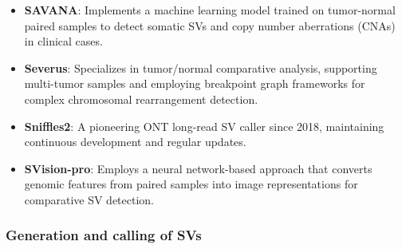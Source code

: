 \begin{itemize}[label=\tiny\raise.5ex\hbox{•}, leftmargin=\parindent]

    



    \item \textbf{SAVANA}: Implements a machine learning model trained on 
    tumor-normal paired samples to detect somatic SVs and copy number 
    aberrations (CNAs) in clinical cases.

    \item \textbf{Severus}: Specializes in tumor/normal comparative analysis, 
    supporting multi-tumor samples and employing breakpoint graph frameworks 
    for complex chromosomal rearrangement detection.

    \item \textbf{Sniffles2}: A pioneering ONT long-read SV caller since 2018, 
    maintaining continuous development and regular updates.

    \item \textbf{SVision-pro}: Employs a neural network-based approach that 
    converts genomic features from paired samples into image representations 
    for comparative SV detection.
    
\end{itemize}

\subsubsection{Generation and calling of SVs}

